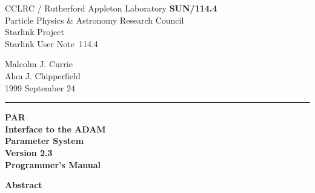 \documentclass[twoside,11pt]{article}
\newcommand{\stardoccategory}  {Starlink User Note}
\newcommand{\stardocinitials}  {SUN}
\newcommand{\stardocnumber}    {114.4}
\newcommand{\stardocauthors}   {Malcolm J. Currie\\
                                Alan J. Chipperfield}
\newcommand{\stardocdate}      {1999 September 24}
\newcommand{\stardoctitle}     {PAR \\ [1ex]
                                Interface to the ADAM \\
                                Parameter System}
\newcommand{\stardocversion}   {Version 2.3}
\newcommand{\stardocmanual}    {Programmer's Manual}
\newcommand{\stardocname}{\stardocinitials /\stardocnumber}
\newenvironment{latexonly}{}{}
\begin{document}
\thispagestyle{empty}

\begin{latexonly}
   CCLRC / {\sc Rutherford Appleton Laboratory} \hfill {\bf \stardocname}\\
   {\large Particle Physics \& Astronomy Research Council}\\
   {\large Starlink Project\\}
   {\large \stardoccategory\ \stardocnumber}
   \begin{flushright}
   \stardocauthors\\
   \stardocdate
   \end{flushright}
   \vspace{-4mm}
   \rule{\textwidth}{0.5mm}
   \vspace{5mm}
   \begin{center}
   {\Huge\bf  \stardoctitle \\ [2.5ex]}
   {\LARGE\bf \stardocversion \\ [4ex]}
   {\Huge\bf  \stardocmanual}
   \end{center}
   \vspace{5mm}


   \vspace{10mm}
   \begin{center}
      {\Large\bf Abstract}
   \end{center}
\end{latexonly}
\end{document}
